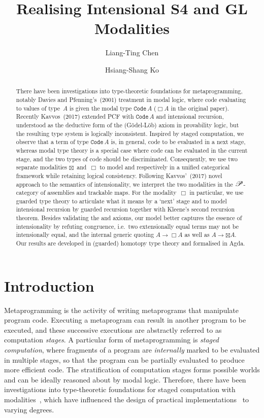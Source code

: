 \documentclass[a4paper,UKenglish,numberwithinsect,cleveref,thm-restate]{lipics-v2021}
\title{Realising Intensional S4 and GL Modalities}
\author{Liang-Ting Chen}%
  {Institute of Information Science, Academia Sinica, Taiwan~\url{https://l-tchen.github.io}}%
  {liang.ting.chen.tw@gmail.com}%
  {https://orcid.org/0000-0002-3250-1331}{}
\author{Hsiang-Shang Ko}%
  {Institute of Information Science, Academia Sinica, Taiwan~\url{https://josh-hs-ko.github.io}}%
  {joshko@iis.sinica.edu.tw}%
  {https://orcid.org/0000-0002-2439-1048}{}
\numberwithin{equation}{section}
\theoremstyle{definition}
\theoremstyle{plain}
\begin{document}
\maketitle

\begin{abstract}

There have been investigations into type-theoretic foundations for metaprogramming, notably Davies and Pfenning's~(2001) treatment in \SFour modal logic, where code evaluating to values of type~$A$ is given the modal type $\mathtt{Code}\,A$ ($\Box A$ in the original paper).
Recently Kavvos~(2017) extended PCF with $\mathtt{Code}\,A$ and intensional recursion, understood as the deductive form of the \GL (Gödel-Löb) axiom in provability logic, but the resulting type system is logically inconsistent.
Inspired by staged computation, we observe that a term of type $\mathtt{Code}\,A$ is, in general, code to be evaluated in a next stage, whereas \SFour modal type theory is a special case where code can be evaluated in the current stage, and the two types of code should be discriminated.
Consequently, we use two separate modalities $\boxtimes$~and~$\Box$ to model \SFour and \GL respectively in a unified categorical framework while retaining logical consistency.
Following Kavvos'~(2017) novel approach to the semantics of intensionality, we interpret the two modalities in the $\mathscr{P}$-category of assemblies and trackable maps.
For the \GL modality~$\Box$ in particular, we use guarded type theory to articulate what it means by a `next' stage and to model intensional recursion by guarded recursion together with Kleene's second recursion theorem.
Besides validating the \SFour and \GL axioms, our model better captures the essence of intensionality by refuting congruence, i.e.\ two extensionally equal terms may not be intensionally equal, and the internal generic quoting $A \to \Box A$ as well as $A \to \boxtimes A$.
Our results are developed in (guarded) homotopy type theory and formalised in Agda.
\end{abstract}

\section{Introduction}\label{sec:intro}

Metaprogramming is the activity of writing metaprograms that manipulate program code.
Executing a metaprogram can result in another program to be executed, and these successive executions are abstractly referred to as computation \emph{stages}.
A particular form of metaprogramming is \emph{staged computation}, where fragments of a program are \emph{internally} marked to be evaluated in multiple stages, so that the program can be partially evaluated to produce more efficient code.
The stratification of computation stages forms possible worlds and can be ideally reasoned about by modal logic.
Therefore, there have been investigations into type-theoretic foundations for staged computation with modalities~\cite{Davies2017,Davies2001b,Kavvos2017a,Nanevski2008}, which have influenced the design of practical implementations~\cite{Kiselyov2014,Sheard2002,Taha2000} to varying degrees.
\end{document}
